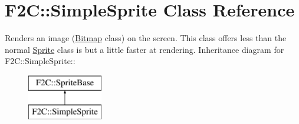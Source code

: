 \hypertarget{class_f2_c_1_1_simple_sprite}{
\section{F2C::SimpleSprite Class Reference}
\label{class_f2_c_1_1_simple_sprite}
}


Renders an image (\hyperlink{class_f2_c_1_1_bitmap}{Bitmap} class) on the screen. This class offers less than the normal \hyperlink{class_f2_c_1_1_sprite}{Sprite} class is but a little faster at rendering.  
Inheritance diagram for F2C::SimpleSprite::\begin{figure}[H]
\begin{center}
\leavevmode
\includegraphics[height=2cm]{class_f2_c_1_1_simple_sprite}
\end{center}
\end{figure}
